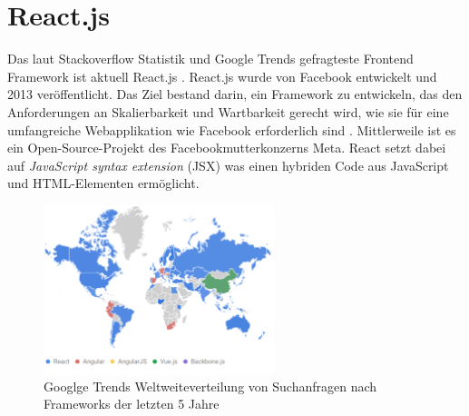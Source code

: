 \section{React.js}
Das laut Stackoverflow Statistik und Google Trends gefragteste Frontend Framework ist aktuell React.js \cite{googleTrends} \cite{stackoverflowStats}.
React.js wurde von Facebook entwickelt und 2013 veröffentlicht.
Das Ziel bestand darin, ein Framework zu entwickeln,
das den Anforderungen an Skalierbarkeit und Wartbarkeit gerecht wird,
wie sie für eine umfangreiche Webapplikation wie Facebook erforderlich sind \cite[S. 1]{gackenheimer2015introduction}.
Mittlerweile ist es ein Open-Source-Projekt des Facebookmutterkonzerns Meta.
React setzt dabei auf \emph{JavaScript syntax extension} (JSX) was einen hybriden Code aus JavaScript und HTML-Elementen ermöglicht. \cite{react}


\begin{figure}[!htb]
    \centering
    \includegraphics[width=0.6\textwidth]{img/Google Stats/2023-04-26 12_20_26-React, Angular, AngularJS, Vue.js, Backbone.js - Erkunden - Google Trends}
    \caption{Googlge Trends Weltweiteverteilung von Suchanfragen nach Frameworks der letzten 5 Jahre \cite{googleTrends}}
    \label{fig:google_trends_world}
\end{figure}

